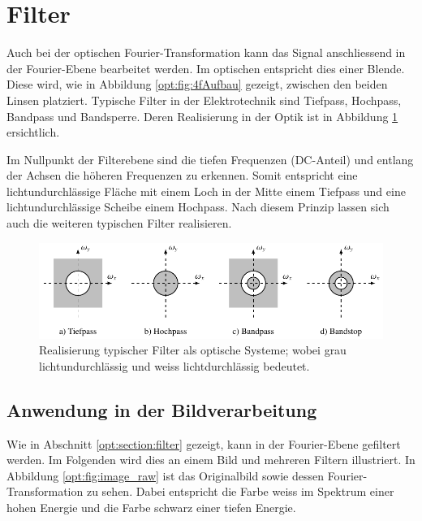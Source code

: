 %
%
%
%
\section{Filter
\label{opt:section:filter}}

Auch bei der optischen Fourier-Transformation kann das Signal anschliessend in der Fourier-Ebene bearbeitet werden.
Im optischen entspricht dies einer Blende.
Diese wird, wie in Abbildung \ref{opt:fig:4fAufbau} gezeigt, zwischen den beiden Linsen platziert.
Typische Filter in der Elektrotechnik sind Tiefpass, Hochpass, Bandpass und Bandsperre.
Deren Realisierung in der Optik ist in Abbildung \ref{opt:fig:filterarten} ersichtlich.

Im Nullpunkt der Filterebene sind die tiefen Frequenzen (DC-Anteil) und entlang der Achsen die höheren Frequenzen zu erkennen.
Somit entspricht eine lichtundurchlässige Fläche mit einem Loch in der Mitte einem Tiefpass und eine lichtundurchlässige Scheibe einem Hochpass.
Nach diesem Prinzip lassen sich auch die weiteren typischen Filter realisieren.

\begin{figure}
    \centering
    \includegraphics[width=\textwidth]{papers/opt/images/filterarten.pdf}

    \caption{Realisierung typischer Filter als optische Systeme;
        wobei grau lichtundurchlässig und weiss lichtdurchlässig bedeutet.}
    \label{opt:fig:filterarten}
\end{figure}

\subsection{Anwendung in der Bildverarbeitung}
\label{opt:section:image_processing}

Wie in Abschnitt \ref{opt:section:filter} gezeigt, kann in der Fourier-Ebene gefiltert werden.
Im Folgenden wird dies an einem Bild und mehreren Filtern illustriert.
In Abbildung \ref{opt:fig:image_raw} ist das Originalbild sowie dessen Fourier-Transformation zu sehen.
Dabei entspricht die Farbe weiss im Spektrum einer hohen Energie und die Farbe schwarz einer tiefen Energie.

